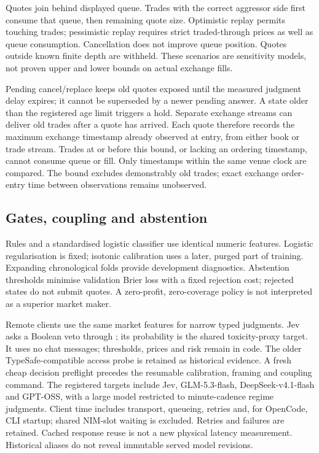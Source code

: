 \documentclass[11pt]{article}
\begin{document}
Quotes join behind displayed queue. Trades with the correct aggressor side first
consume that queue, then remaining quote size. Optimistic replay permits touching
trades; pessimistic replay requires strict traded-through prices as well as queue
consumption. Cancellation does not improve queue position. Quotes outside known
finite depth are withheld. These scenarios are sensitivity models, not proven
upper and lower bounds on actual exchange fills.

Pending cancel/replace keeps old quotes exposed until the measured judgment delay
expires; it cannot be superseded by a newer pending answer. A state older than the
registered age limit triggers a hold. Separate exchange streams can deliver old
trades after a quote has arrived. Each quote therefore records the maximum
exchange timestamp already observed at entry, from either book or trade stream.
Trades at or before this bound, or lacking an ordering timestamp, cannot consume
queue or fill. Only timestamps within the same venue clock are compared. The
bound excludes demonstrably old trades; exact exchange order-entry time between
observations remains unobserved.

\subsection{Gates, coupling and abstention}
Rules and a standardised logistic classifier use identical numeric features.
Logistic regularisation is fixed; isotonic calibration uses a later, purged part
of training. Expanding chronological folds provide development diagnostics.
Abstention thresholds minimise validation Brier loss with a fixed rejection cost;
rejected states do not submit quotes. A zero-profit, zero-coverage policy is not
interpreted as a superior market maker.

Remote clients use the same market features for narrow typed judgments.
Jev asks a Boolean veto through ; its probability is the
shared toxicity-proxy target. It uses no chat messages; thresholds, prices and
risk remain in code. The older TypeSafe-compatible access probe is retained as
historical evidence. A fresh cheap decision preflight precedes the resumable
calibration, framing and coupling command. The
registered targets include Jev, GLM-5.3-flash, DeepSeek-v4.1-flash and GPT-OSS, with
a large model restricted to minute-cadence regime judgments. Client time includes
transport, queueing, retries and, for OpenCode, CLI startup; shared NIM-slot waiting
is excluded. Retries and failures are retained. Cached response reuse is not a new
physical latency measurement. Historical aliases do not reveal immutable served
model revisions.
\end{document}
